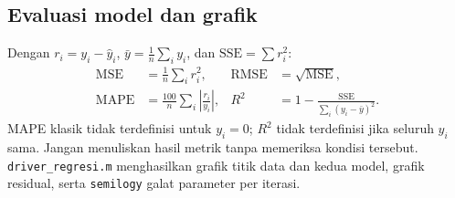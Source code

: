 \subsection{Evaluasi model dan grafik}
Dengan $r_i=y_i-\widehat y_i$, $\bar y=\frac1n\sum_i y_i$, dan $\mathrm{SSE}=\sum r_i^2$:
\begin{align}
\mathrm{MSE}&=\frac1n\sum_i r_i^2, &
\mathrm{RMSE}&=\sqrt{\mathrm{MSE}},\\
\mathrm{MAPE}&=\frac{100}{n}\sum_i\left|\frac{r_i}{y_i}\right|, &
R^2&=1-\frac{\mathrm{SSE}}{\sum_i(y_i-\bar y)^2}.
\end{align}
MAPE klasik tidak terdefinisi untuk $y_i=0$; $R^2$ tidak terdefinisi jika seluruh $y_i$ sama. Jangan menuliskan hasil metrik tanpa memeriksa kondisi tersebut. \texttt{driver\_regresi.m} menghasilkan grafik titik data dan kedua model, grafik residual, serta \texttt{semilogy} galat parameter per iterasi.

